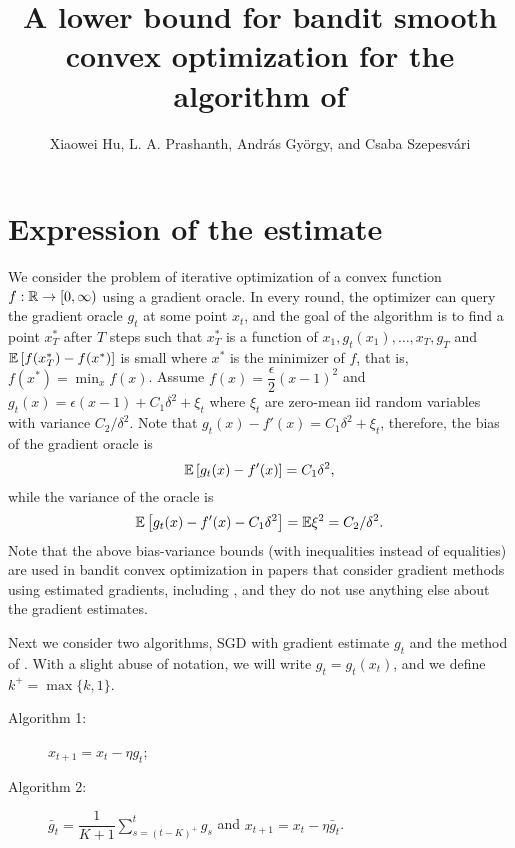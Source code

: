 \documentclass[11pt,letterpaper,english]{article}
\author{Xiaowei Hu, L. A. Prashanth, Andr\'as Gy\"orgy, and Csaba Szepesv\'ari}
\title{A lower bound for bandit smooth convex optimization for the algorithm of \citet{DekelEK15}}
\begin{document}
\maketitle

\section{Expression of the estimate}


We consider the problem of iterative optimization of a convex function $f:\mathbb{R} \to [0,\infty)$ using a gradient oracle.
In every round, the optimizer can query the gradient oracle $g_t$ at some point $x_t$, and the goal of the algorithm is to find a point $x^*_T$ after $T$ steps such that $x^*_T$ is a function of $x_1,g_t(x_1),\ldots, x_{T},g_T$ and $\mathbb{E}\left[f(x^*_T)-f(x^*)\right]$ is small where $x^*$ is the minimizer of $f$, that is, $f(x^*)=\min_x f(x)$. Assume $f(x) = \dfrac{\epsilon}{2} (x-1)^2$ and 
$g_t(x) = \epsilon (x-1) + C_1 \delta^2 + \xi_t$ where $\xi_t$ are zero-mean iid random variables with variance $C_2 /\delta^2$.
Note that 
$g_t(x)-f'(x)=C_1 \delta^2 + \xi_t$, therefore, the bias of the gradient oracle is 
\[
\mathbb{E}\left[g_t(x)-f'(x)\right]=C_1 \delta^2,
\] 
while the variance of the oracle is
\[
\mathbb{E}\left[g_t(x)-f'(x)-C_1 \delta^2\right] = \mathbb{E}{\xi^2} = C_2 /\delta^2.
\]
Note that the above bias-variance bounds (with inequalities instead of equalities) are used in bandit convex optimization in papers that consider gradient methods using estimated gradients, including \citep{DekelEK15}, and they do not use anything else about the gradient estimates.

Next we consider two algorithms, SGD with gradient estimate $g_t$ and the method of \citet{DekelEK15}. With a slight abuse of notation, we will write $g_t=g_t(x_t)$, and we define $k^+=\max\{k,1\}$.
\begin{description}
\item[Algorithm 1:] $ x_{t+1} = x_t - \eta  g_t$;

\item[Algorithm 2:] $\bar{g}_t = \dfrac{1}{K+1}  \sum_{s=(t-K)^+}^t g_s$ and
$x_{t+1} = x_t - \eta  \bar{g}_t$.
\end{description}
\end{document}
